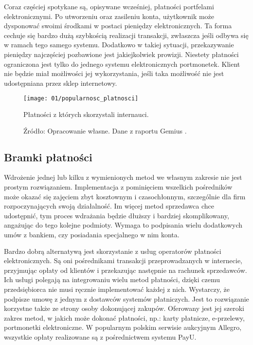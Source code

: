 Coraz częściej spotykane są, opisywane wcześniej, płatności portfelami 
elektronicznymi. Po utworzeniu oraz zasileniu konta, użytkownik może dysponować 
swoimi środkami w postaci pieniędzy elektronicznych. Ta forma cechuje się 
bardzo dużą szybkością realizacji transakcji, zwłaszcza jeśli odbywa się w 
ramach tego samego systemu. Dodatkowo w takiej sytuacji, przekazywanie 
pieniędzy najczęściej pozbawione jest jakiejkolwiek prowizji. Niestety 
płatności ograniczona jest tylko do jednego systemu elektronicznych 
portmonetek. Klient nie będzie miał możliwości jej wykorzystania, jeśli taka 
możliwość nie jest udostępniana przez sklep internetowy.

\begin{figure}[h]
	\begin{center}
		\texttt{[image: 01/popularnosc\_platnosci]}
	\end{center}
	\caption{Płatności z których skorzystali internauci.}
	\vspace{-0.4cm}
	\caption*{Źródło: Opracowanie własne. Dane z raportu Gemius \cite{raport-ecommerce2014}.}
\end{figure}

\subsection{Bramki płatności}

Wdrożenie jednej lub kilku z wymienionych metod we własnym zakresie nie jest 
prostym rozwiązaniem. Implementacja z pominięciem wszelkich pośredników może 
okazać się zajęciem zbyt kosztownym i czasochłonnym, szczególnie dla firm 
rozpoczynających swoją działalność. Im więcej metod sprzedawca chce udostępnić, 
tym proces wdrażania będzie dłuższy i bardziej skomplikowany, angażując do tego kolejne 
podmioty. Wymaga to podpisania wielu dodatkowych umów z bankiem, czy posiadania 
specjalnego w nim konta. 

Bardzo dobrą alternatywą jest skorzystanie z usług operatorów płatności 
elektronicznych. Są oni pośrednikami transakcji przeprowadzanych w internecie, 
przyjmując opłaty od klientów i przekazując następnie na rachunek sprzedawców. 
Ich usługi polegają na integrowaniu wielu metod płatności, dzięki czemu 
przedsiębiorca nie musi ręcznie implementować każdej z nich. Wystarczy, że podpisze 
umowę z jednym z dostawców systemów płatniczych. Jest to rozwiązanie korzystne 
także ze strony osoby dokonującej zakupów. Oferowany jest jej szeroki zakres 
metod, w jakich może dokonać płatności, np.: karty płatnicze, e-przelewy, 
portmonetki elektroniczne. W popularnym polskim serwisie aukcyjnym Allegro, wszystkie opłaty 
realizowane są z pośrednictwem systemu PayU.

